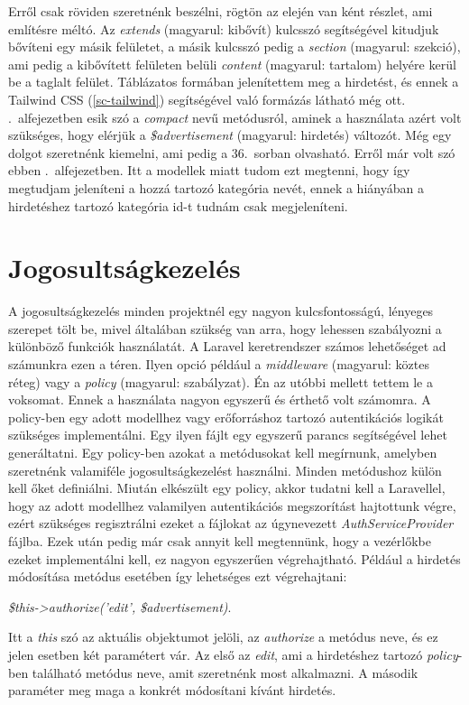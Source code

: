 \documentclass[]{thesis-ekf}
\theoremstyle{definition}
\theoremstyle{remark}
\begin{document}
		Erről csak röviden szeretnénk beszélni, rögtön az elején van ként részlet, ami említésre méltó. Az \emph{extends} (magyarul: kibővít) kulcsszó segítségével kitudjuk bővíteni egy másik felületet, a másik kulcsszó pedig a \emph{section} (magyarul: szekció), ami pedig a kibővített felületen belüli \emph{content} (magyarul: tartalom) helyére kerül be a taglalt felület. Táblázatos formában jelenítettem meg a hirdetést, és ennek a Tailwind CSS (\ref{sc-tailwind}) segítségével való formázás látható még ott. .~alfejezetben esik szó a \emph{compact} nevű metódusról, aminek a használata azért volt szükséges, hogy elérjük a \emph{\$advertisement} (magyarul: hirdetés) változót. Még egy dolgot szeretnénk kiemelni, ami pedig a 36.~sorban olvasható. Erről már volt szó ebben .~alfejezetben. Itt a modellek miatt tudom ezt megtenni, hogy így megtudjam jeleníteni a hozzá tartozó kategória nevét, ennek a hiányában a hirdetéshez tartozó kategória id-t tudnám csak megjeleníteni.
	\section{Jogosultságkezelés}
		A jogosultságkezelés minden projektnél egy nagyon kulcsfontosságú, lényeges szerepet tölt be, mivel általában szükség van arra, hogy lehessen szabályozni a különböző funkciók használatát. A Laravel keretrendszer számos lehetőséget ad számunkra ezen a téren. Ilyen opció például a \emph{middleware} (magyarul: köztes réteg) vagy a \emph{policy} (magyarul: szabályzat). Én az utóbbi mellett tettem le a voksomat. Ennek a használata nagyon egyszerű és érthető volt számomra. A policy-ben egy adott modellhez vagy erőforráshoz tartozó autentikációs logikát szükséges implementálni. Egy ilyen fájlt egy egyszerű parancs segítségével lehet generáltatni. Egy policy-ben azokat a metódusokat kell megírnunk, amelyben szeretnénk valamiféle jogosultságkezelést használni. Minden metódushoz külön kell őket definiálni. Miután elkészült egy policy, akkor tudatni kell a Laravellel, hogy az adott modellhez valamilyen autentikációs megszorítást hajtottunk végre, ezért szükséges regisztrálni ezeket a fájlokat az úgynevezett \emph{AuthServiceProvider} fájlba. Ezek után pedig már csak annyit kell megtennünk, hogy a vezérlőkbe ezeket implementálni kell, ez nagyon egyszerűen végrehajtható. Például a hirdetés módosítása metódus esetében így lehetséges ezt végrehajtani: 
		\begin{center}
			\emph{\$this->authorize('edit', \$advertisement)}.
		\end{center}
		Itt a \emph{this} szó az aktuális objektumot jelöli, az \emph{authorize} a metódus neve, és ez jelen esetben két paramétert vár. Az első az \emph{edit}, ami a hirdetéshez tartozó \emph{policy}-ben található metódus neve, amit szeretnénk most alkalmazni. A második paraméter meg maga a konkrét módosítani kívánt hirdetés.
		\cite{Laravel}
		
\end{document}
